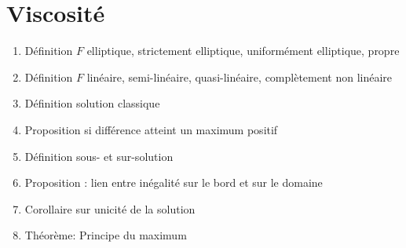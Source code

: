 \documentclass{article}
\begin{document}
\part{Viscosité}
\begin{enumerate}
\section{Solution classique}
	\item Définition $F$ elliptique, strictement elliptique, uniformément elliptique, propre
	\item Définition $F$ linéaire, semi-linéaire, quasi-linéaire, complètement non linéaire
	\item Définition solution classique
	\item Proposition si différence atteint un maximum positif
	\item Définition sous- et sur-solution
	\item Proposition : lien entre inégalité sur le bord et sur le domaine
	\item Corollaire sur unicité de la solution
	\item Théorème: Principe du maximum

\end{enumerate}
\end{document}
